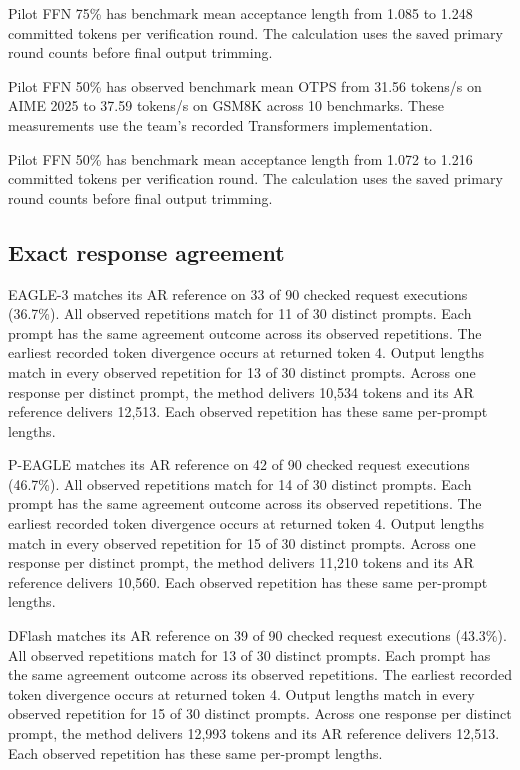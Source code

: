 Pilot FFN 75\% has benchmark mean acceptance length from 1.085 to 1.248 committed tokens per verification round. The calculation uses the saved primary round counts before final output trimming.

Pilot FFN 50\% has observed benchmark mean OTPS from 31.56 tokens/s on AIME 2025 to 37.59 tokens/s on GSM8K across 10 benchmarks. These measurements use the team's recorded Transformers implementation.

Pilot FFN 50\% has benchmark mean acceptance length from 1.072 to 1.216 committed tokens per verification round. The calculation uses the saved primary round counts before final output trimming.

\subsection{Exact response agreement}

EAGLE-3 matches its AR reference on 33 of 90 checked request executions (36.7\%). All observed repetitions match for 11 of 30 distinct prompts. Each prompt has the same agreement outcome across its observed repetitions. The earliest recorded token divergence occurs at returned token 4. Output lengths match in every observed repetition for 13 of 30 distinct prompts. Across one response per distinct prompt, the method delivers 10,534 tokens and its AR reference delivers 12,513. Each observed repetition has these same per-prompt lengths.

P-EAGLE matches its AR reference on 42 of 90 checked request executions (46.7\%). All observed repetitions match for 14 of 30 distinct prompts. Each prompt has the same agreement outcome across its observed repetitions. The earliest recorded token divergence occurs at returned token 4. Output lengths match in every observed repetition for 15 of 30 distinct prompts. Across one response per distinct prompt, the method delivers 11,210 tokens and its AR reference delivers 10,560. Each observed repetition has these same per-prompt lengths.

DFlash matches its AR reference on 39 of 90 checked request executions (43.3\%). All observed repetitions match for 13 of 30 distinct prompts. Each prompt has the same agreement outcome across its observed repetitions. The earliest recorded token divergence occurs at returned token 4. Output lengths match in every observed repetition for 15 of 30 distinct prompts. Across one response per distinct prompt, the method delivers 12,993 tokens and its AR reference delivers 12,513. Each observed repetition has these same per-prompt lengths.

